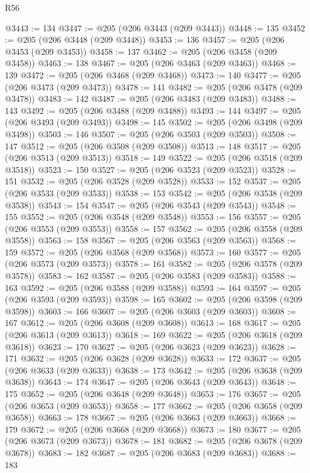 \begin{lexlean}{R56}
\begin{coremodule}
@3443 := 134
@3447 := @205 (@206 @3443 (@209 @3443))
@3448 := 135
@3452 := @205 (@206 @3448 (@209 @3448))
@3453 := 136
@3457 := @205 (@206 @3453 (@209 @3453))
@3458 := 137
@3462 := @205 (@206 @3458 (@209 @3458))
@3463 := 138
@3467 := @205 (@206 @3463 (@209 @3463))
@3468 := 139
@3472 := @205 (@206 @3468 (@209 @3468))
@3473 := 140
@3477 := @205 (@206 @3473 (@209 @3473))
@3478 := 141
@3482 := @205 (@206 @3478 (@209 @3478))
@3483 := 142
@3487 := @205 (@206 @3483 (@209 @3483))
@3488 := 143
@3492 := @205 (@206 @3488 (@209 @3488))
@3493 := 144
@3497 := @205 (@206 @3493 (@209 @3493))
@3498 := 145
@3502 := @205 (@206 @3498 (@209 @3498))
@3503 := 146
@3507 := @205 (@206 @3503 (@209 @3503))
@3508 := 147
@3512 := @205 (@206 @3508 (@209 @3508))
@3513 := 148
@3517 := @205 (@206 @3513 (@209 @3513))
@3518 := 149
@3522 := @205 (@206 @3518 (@209 @3518))
@3523 := 150
@3527 := @205 (@206 @3523 (@209 @3523))
@3528 := 151
@3532 := @205 (@206 @3528 (@209 @3528))
@3533 := 152
@3537 := @205 (@206 @3533 (@209 @3533))
@3538 := 153
@3542 := @205 (@206 @3538 (@209 @3538))
@3543 := 154
@3547 := @205 (@206 @3543 (@209 @3543))
@3548 := 155
@3552 := @205 (@206 @3548 (@209 @3548))
@3553 := 156
@3557 := @205 (@206 @3553 (@209 @3553))
@3558 := 157
@3562 := @205 (@206 @3558 (@209 @3558))
@3563 := 158
@3567 := @205 (@206 @3563 (@209 @3563))
@3568 := 159
@3572 := @205 (@206 @3568 (@209 @3568))
@3573 := 160
@3577 := @205 (@206 @3573 (@209 @3573))
@3578 := 161
@3582 := @205 (@206 @3578 (@209 @3578))
@3583 := 162
@3587 := @205 (@206 @3583 (@209 @3583))
@3588 := 163
@3592 := @205 (@206 @3588 (@209 @3588))
@3593 := 164
@3597 := @205 (@206 @3593 (@209 @3593))
@3598 := 165
@3602 := @205 (@206 @3598 (@209 @3598))
@3603 := 166
@3607 := @205 (@206 @3603 (@209 @3603))
@3608 := 167
@3612 := @205 (@206 @3608 (@209 @3608))
@3613 := 168
@3617 := @205 (@206 @3613 (@209 @3613))
@3618 := 169
@3622 := @205 (@206 @3618 (@209 @3618))
@3623 := 170
@3627 := @205 (@206 @3623 (@209 @3623))
@3628 := 171
@3632 := @205 (@206 @3628 (@209 @3628))
@3633 := 172
@3637 := @205 (@206 @3633 (@209 @3633))
@3638 := 173
@3642 := @205 (@206 @3638 (@209 @3638))
@3643 := 174
@3647 := @205 (@206 @3643 (@209 @3643))
@3648 := 175
@3652 := @205 (@206 @3648 (@209 @3648))
@3653 := 176
@3657 := @205 (@206 @3653 (@209 @3653))
@3658 := 177
@3662 := @205 (@206 @3658 (@209 @3658))
@3663 := 178
@3667 := @205 (@206 @3663 (@209 @3663))
@3668 := 179
@3672 := @205 (@206 @3668 (@209 @3668))
@3673 := 180
@3677 := @205 (@206 @3673 (@209 @3673))
@3678 := 181
@3682 := @205 (@206 @3678 (@209 @3678))
@3683 := 182
@3687 := @205 (@206 @3683 (@209 @3683))
@3688 := 183

\end{coremodule}
\end{lexlean}
